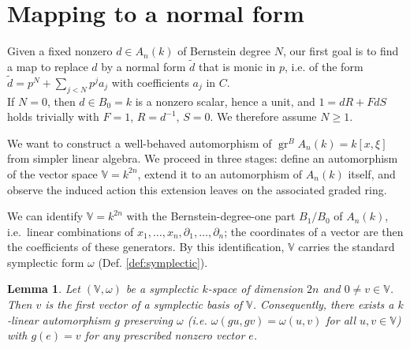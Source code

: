 \documentclass[pdflatex,sn-mathphys-num]{sn-jnl}
\numberwithin{equation}{section}
\theoremstyle{thmstyleone}
\newtheorem{lemma}[theorem]{Lemma}
\theoremstyle{thmstyletwo}
\newcommand{\gr}{\operatorname{gr}}
\begin{document}
\section{Mapping to a normal form}\label{sec:monic}
Given a fixed nonzero $d \in A_n(k)$ of Bernstein degree $N$, our first goal is to find a map to replace $d$ by a normal form $\tilde{d}$ that is monic in $p$, i.e. of the form $\tilde d=p^N+\sum_{j<N}p^ja_j$ with coefficients $a_j$ in $C$. \\

If $N=0$, then $d \in B_0 = k$ is a nonzero scalar, hence a unit, and $1 = dR+FdS$ holds trivially with $F=1$, $R=d^{-1}$, $S=0$. We therefore assume $N\geq1$.


We want to construct a well-behaved automorphism of $\gr^BA_n(k)=k[x,\xi]$
from simpler linear algebra. We proceed in three stages:
define an automorphism of the vector space $\mathbb V=k^{2n}$, extend it to
an automorphism of $A_n(k)$ itself, and observe the induced action this
extension leaves on the associated graded ring.

We can identify $\mathbb V = k^{2n}$ with the Bernstein-degree-one part $B_1/B_0$ of
$A_n(k)$, i.e.\ linear combinations of $x_1,\ldots,x_n,\partial_1,\ldots,
\partial_n$; the coordinates of a vector are then the coefficients of
these generators. By this identification, $\mathbb V$ carries the standard symplectic form $\omega$ (Def. \ref{def:symplectic}). 

\begin{lemma}\label{lem:sympcompl}
Let $(\mathbb V,\omega)$ be a symplectic $k$-space of dimension $2n$ and $0\neq v\in \mathbb V$.
Then $v$ is the first vector of a symplectic basis of $\mathbb V$. Consequently, there
exists a $k$-linear automorphism $g$ preserving $\omega$ (i.e. $\omega(gu,gv)=\omega(u,v)$ for all
$u,v\in\mathbb V$) with $g(e)=v$ for any prescribed nonzero vector $e$.
\end{lemma}
\end{document}
